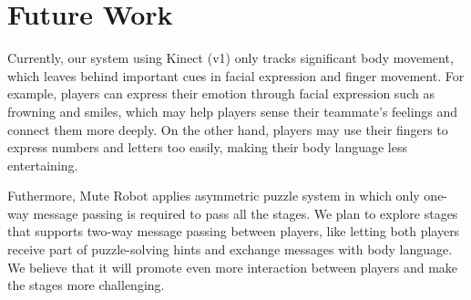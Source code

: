 \documentclass{chi-ext}
\begin{document}




\section{Future Work}

Currently, our system using Kinect (v1) only tracks significant body movement, which leaves behind important cues in facial expression and finger movement. 
For example, players can express their emotion through facial expression such as frowning and smiles, which may help players sense their teammate's feelings and connect them more deeply. On the other hand, players may use their fingers to express numbers and letters too easily, making their body language less entertaining. 


Futhermore, Mute Robot applies asymmetric puzzle system in which
only one-way message passing is required to pass all the stages.
We plan to explore stages that supports two-way message passing between players, like letting both players receive part of puzzle-solving hints and exchange messages with body language.
We believe that it will promote even more interaction between players and make the stages more challenging.

\end{document}
